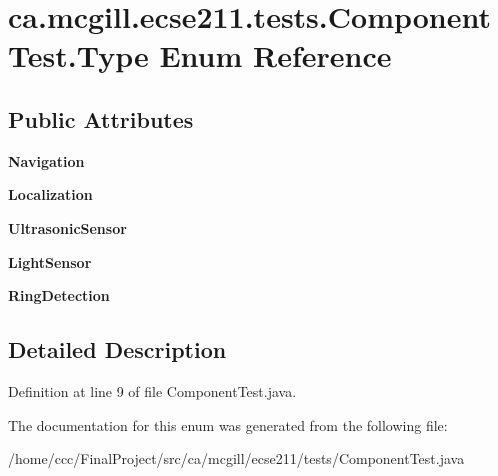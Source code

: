 \hypertarget{enumca_1_1mcgill_1_1ecse211_1_1tests_1_1_component_test_1_1_type}{}\section{ca.\+mcgill.\+ecse211.\+tests.\+Component\+Test.\+Type Enum Reference}
\label{enumca_1_1mcgill_1_1ecse211_1_1tests_1_1_component_test_1_1_type}
\subsection*{Public Attributes}
\begin{DoxyCompactItemize}
\item 
\mbox{\label{enumca_1_1mcgill_1_1ecse211_1_1tests_1_1_component_test_1_1_type_a70ec62ab2b745dd99e291459279910ea}} 
{\bfseries Navigation}
\item 
\mbox{\label{enumca_1_1mcgill_1_1ecse211_1_1tests_1_1_component_test_1_1_type_acdc93de9366f2e6710c7f2fc0e4478c3}} 
{\bfseries Localization}
\item 
\mbox{\label{enumca_1_1mcgill_1_1ecse211_1_1tests_1_1_component_test_1_1_type_acb88d74b8bd35b190f8b1b05730c213a}} 
{\bfseries Ultrasonic\+Sensor}
\item 
\mbox{\label{enumca_1_1mcgill_1_1ecse211_1_1tests_1_1_component_test_1_1_type_aa8c9262ad5014cd52ecce2eec6604510}} 
{\bfseries Light\+Sensor}
\item 
\mbox{\label{enumca_1_1mcgill_1_1ecse211_1_1tests_1_1_component_test_1_1_type_ab118eac94e0b37e6871a4c9a788c675e}} 
{\bfseries Ring\+Detection}
\end{DoxyCompactItemize}


\subsection{Detailed Description}


Definition at line 9 of file Component\+Test.\+java.



The documentation for this enum was generated from the following file\+:\begin{DoxyCompactItemize}
\item 
/home/ccc/\+Final\+Project/src/ca/mcgill/ecse211/tests/Component\+Test.\+java\end{DoxyCompactItemize}
